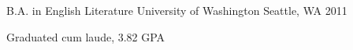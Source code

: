 


\begin{cventries}


\cventry
{B.A. in English Literature} %
{University of Washington} %
{Seattle, WA} %
{2011} %
{ %
\begin{cvitems}
\item {Graduated cum laude, 3.82 GPA}
\end{cvitems}
}


\end{cventries}
